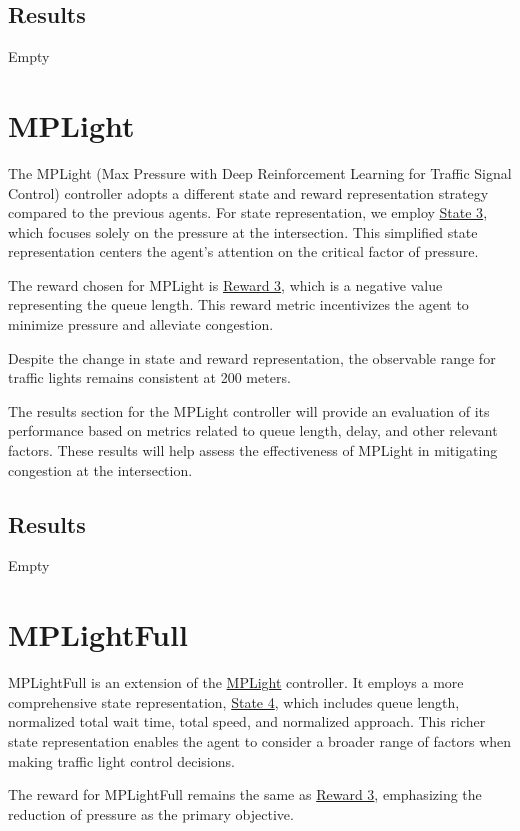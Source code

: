 \subsection{Results}
Empty

\section{MPLight} \label{sec:exp-mplight}
The MPLight (Max Pressure with Deep Reinforcement Learning for Traffic Signal Control) controller adopts a different state and reward representation strategy compared to the previous agents. For state representation, we employ \hyperref[subsec:state-3]{State 3}, which focuses solely on the pressure at the intersection. This simplified state representation centers the agent's attention on the critical factor of pressure.

The reward chosen for MPLight is \hyperref[subsec:reward-3]{Reward 3}, which is a negative value representing the queue length. This reward metric incentivizes the agent to minimize pressure and alleviate congestion.

Despite the change in state and reward representation, the observable range for traffic lights remains consistent at 200 meters.

The results section for the MPLight controller will provide an evaluation of its performance based on metrics related to queue length, delay, and other relevant factors. These results will help assess the effectiveness of MPLight in mitigating congestion at the intersection.

\subsection{Results}
Empty

\section{MPLightFull}
MPLightFull is an extension of the \hyperref[sec:exp-mplight]{MPLight} controller. It employs a more comprehensive state representation, \hyperref[subsec:state-4]{State 4}, which includes queue length, normalized total wait time, total speed, and normalized approach. This richer state representation enables the agent to consider a broader range of factors when making traffic light control decisions.

The reward for MPLightFull remains the same as \hyperref[subsec:reward-3]{Reward 3}, emphasizing the reduction of pressure as the primary objective.

